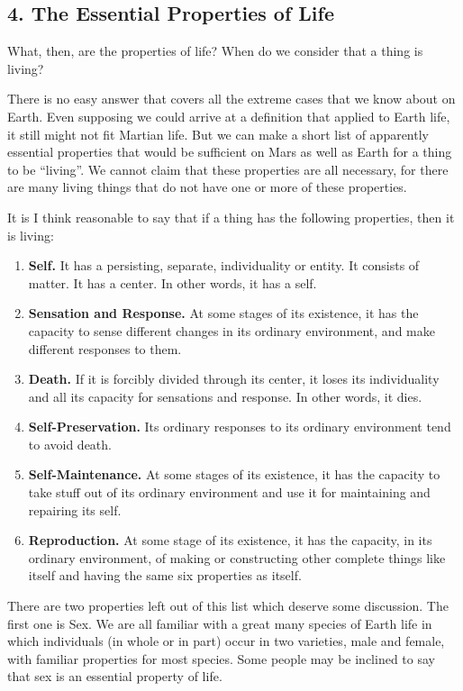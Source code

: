 \documentclass[11pt]{article}
\begin{document}
\subsection*{4. The Essential Properties of Life}

What, then, are the properties of life? When do we consider that a thing is
living?

There is no easy answer that covers all the extreme cases that we know about on
Earth. Even supposing we could arrive at a definition that applied to Earth
life, it still might not fit Martian life. But we can make a short list of
apparently essential properties that would be sufficient on Mars as well as
Earth for a thing to be ``living''. We cannot claim that these properties are
all necessary, for there are many living things that do not have one or more of
these properties.

It is I think reasonable to say that if a thing has the following properties,
then it is living:

\begin{enumerate}
\item \textbf{Self.} It has a persisting, separate, individuality or entity. It
consists of matter. It has a center. In other words, it has a self.
\item \textbf{Sensation and Response.} At some stages of its existence, it has
the capacity to sense different changes in its ordinary environment, and make
different responses to them.
\item \textbf{Death.} If it is forcibly divided through its center, it loses
its individuality and all its capacity for sensations and response. In other
words, it dies.
\item \textbf{Self-Preservation.} Its ordinary responses to its ordinary
environment tend to avoid death.
\item \textbf{Self-Maintenance.} At some stages of its existence, it has the
capacity to take stuff out of its ordinary environment and use it for
maintaining and repairing its self.
\item \textbf{Reproduction.} At some stage of its existence, it has the
capacity, in its ordinary environment, of making or constructing other complete
things like itself and having the same six properties as itself.
\end{enumerate}

There are two properties left out of this list which deserve some discussion.
The first one is Sex. We are all familiar with a great many species of Earth
life in which individuals (in whole or in part) occur in two varieties, male
and female, with familiar properties for most species. Some people may be
inclined to say that sex is an essential property of life.
\end{document}
